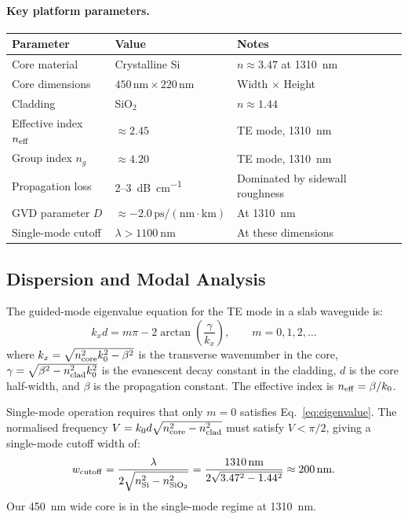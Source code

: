 \documentclass[12pt, a4paper]{article}
\begin{document}
\paragraph{Key platform parameters.}
\begin{center}
\begin{tabular}{lll}
\toprule
\textbf{Parameter} & \textbf{Value} & \textbf{Notes} \\
\midrule
Core material & Crystalline Si & $n \approx 3.47$ at \SI{1310}{\nano\metre} \\
Core dimensions & $450\,\text{nm} \times 220\,\text{nm}$ & Width $\times$ Height \\
Cladding & SiO$_2$ & $n \approx 1.44$ \\
Effective index $n_{\rm eff}$ & $\approx 2.45$ & TE mode, \SI{1310}{\nano\metre} \\
Group index $n_g$ & $\approx 4.20$ & TE mode, \SI{1310}{\nano\metre} \\
Propagation loss & 2--\SI{3}{\dB\per\centi\metre} & Dominated by sidewall roughness \\
GVD parameter $D$ & $\approx -2.0\,\mathrm{ps/(nm\cdot km)}$ & At \SI{1310}{\nano\metre} \\
Single-mode cutoff & $\lambda > \SI{1100}{\nano\metre}$ & At these dimensions \\
\bottomrule
\end{tabular}
\end{center}

\subsection{Dispersion and Modal Analysis}

The guided-mode eigenvalue equation for the TE mode in a slab waveguide is:
\begin{equation}
  k_x d = m\pi - 2\arctan\!\left(\frac{\gamma}{k_x}\right), \qquad m = 0, 1, 2, \ldots
  \label{eq:eigenvalue}
\end{equation}
where $k_x = \sqrt{n_{\rm core}^2 k_0^2 - \beta^2}$ is the transverse
wavenumber in the core, $\gamma = \sqrt{\beta^2 - n_{\rm clad}^2 k_0^2}$ is
the evanescent decay constant in the cladding, $d$ is the core half-width, and
$\beta$ is the propagation constant.
The effective index is $n_{\rm eff} = \beta / k_0$.

Single-mode operation requires that only $m=0$ satisfies
Eq.~\eqref{eq:eigenvalue}.
The normalised frequency $V = k_0 d\sqrt{n_{\rm core}^2 - n_{\rm clad}^2}$
must satisfy $V < \pi/2$, giving a single-mode cutoff width of:
\begin{equation}
  w_{\rm cutoff} = \frac{\lambda}{2\sqrt{n_{\rm Si}^2 - n_{\rm SiO_2}^2}}
  = \frac{1310\,\mathrm{nm}}{2\sqrt{3.47^2 - 1.44^2}} \approx 200\,\mathrm{nm}.
\end{equation}
Our \SI{450}{\nano\metre} wide core is in the single-mode regime at
\SI{1310}{\nano\metre}.
\end{document}
